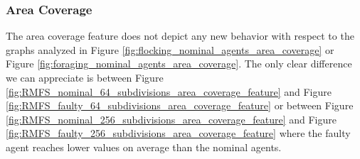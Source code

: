 \documentclass[../../Thesis.tex]{subfiles}
\begin{document}
			\subsubsection{Area Coverage}
				The area coverage feature does not depict any new behavior with respect to the graphs analyzed in Figure \ref{fig:flocking_nominal_agents_area_coverage} or Figure \ref{fig:foraging_nominal_agents_area_coverage}. The only clear difference we can appreciate is between Figure \ref{fig:RMFS_nominal_64_subdivisions_area_coverage_feature} and Figure \ref{fig:RMFS_faulty_64_subdivisions_area_coverage_feature} or between  Figure \ref{fig:RMFS_nominal_256_subdivisions_area_coverage_feature} and Figure \ref{fig:RMFS_faulty_256_subdivisions_area_coverage_feature} where the faulty agent reaches lower values on average than the nominal agents.
				\begin{figure}[H]
					\centering
					\thinspace
\end{figure}
\end{document}
